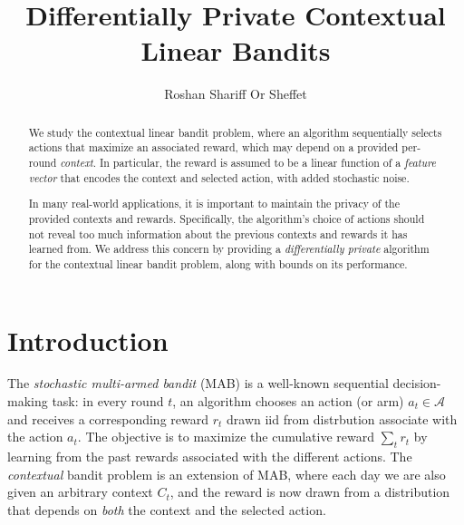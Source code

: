\documentclass{article}
\title{Differentially Private Contextual Linear Bandits}
\author{
  Roshan Shariff
  \And
  Or Sheffet
}
\newcommand{\A}{\mathcal{A}}
\begin{document}
\maketitle

\begin{abstract}
  We study the contextual linear bandit problem, where an algorithm
  sequentially selects actions that maximize an associated reward,
  which may depend on a provided per-round \emph{context}.  In
  particular, the reward is assumed to be a linear function of a
  \emph{feature vector} that encodes the context and selected action,
  with added stochastic noise.

  In many real-world applications, it is important to maintain the
  privacy of the provided contexts and rewards.  Specifically, the
  algorithm's choice of actions should not reveal too much information
  about the previous contexts and rewards it has learned from.  We
  address this concern by providing a \emph{differentially private}
  algorithm for the contextual linear bandit problem, along with
  bounds on its performance.
\end{abstract}

\section{Introduction}
\label{sec:introduction}

The \emph{stochastic multi-armed bandit} (MAB) is a well-known sequential
decision-making task: in every round $t$, an algorithm chooses an
action (or arm) $a_t\in\A$ and receives a corresponding reward $r_t$ drawn iid from distrbution associate with the action $a_t$.
The objective is to maximize the cumulative reward $\sum_t r_t$ by
learning from the past rewards associated with the different actions.
The \emph{contextual} bandit problem is an extension of MAB, where each day we are also given an arbitrary
context $C_t$, and the reward is now drawn from a distribution that depends on \emph{both} the context and the selected action.

\end{document}
